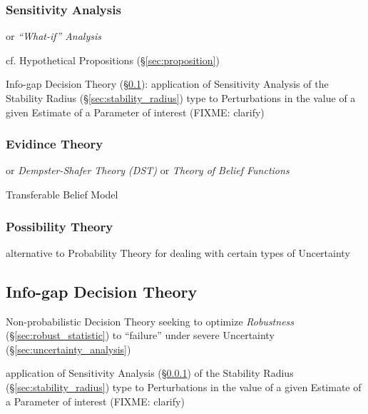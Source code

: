 \subsubsection{Sensitivity Analysis}\label{sec:sensitivity_analysis}

or \emph{``What-if'' Analysis}

cf. Hypothetical Propositions (\S\ref{sec:proposition})

\fist Info-gap Decision Theory (\S\ref{sec:info_gap}): application of
Sensitivity Analysis of the Stability Radius (\S\ref{sec:stability_radius}) type
to Perturbations in the value of a given Estimate of a Parameter of interest
(FIXME: clarify)



\subsubsection{Evidince Theory}\label{sec:evidence_theory}

or \emph{Dempster-Shafer Theory (DST)} or \emph{Theory of Belief Functions}

Transferable Belief Model



\subsubsection{Possibility Theory}\label{sec:possibility_theory}

alternative to Probability Theory for dealing with certain types of Uncertainty



\subsection{Info-gap Decision Theory}\label{sec:info_gap}

Non-probabilistic Decision Theory seeking to optimize \emph{Robustness}
(\S\ref{sec:robust_statistic}) to ``failure'' under severe Uncertainty
(\S\ref{sec:uncertainty_analysis})

application of Sensitivity Analysis (\S\ref{sec:sensitivity_analysis}) of the
Stability Radius (\S\ref{sec:stability_radius}) type to Perturbations in the
value of a given Estimate of a Parameter of interest (FIXME: clarify)



